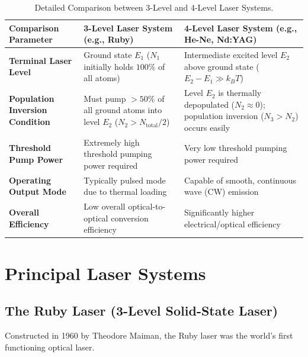 \begin{table}[htbp]
\centering
\small
\renewcommand{\arraystretch}{1.3}
\begin{tabularx}{\linewidth}{lXX}
\toprule
\textbf{Comparison Parameter} & \textbf{3-Level Laser System (e.g., Ruby)} & \textbf{4-Level Laser System (e.g., He-Ne, Nd:YAG)} \\
\midrule
\textbf{Terminal Laser Level} & Ground state $E_1$ ($N_1$ initially holds $100\%$ of all atoms) & Intermediate excited level $E_2$ above ground state ($E_2 - E_1 \gg k_B T$) \\
\textbf{Population Inversion Condition} & Must pump $>50\%$ of all ground atoms into level $E_2$ ($N_2 > N_{\text{total}}/2$) & Level $E_2$ is thermally depopulated ($N_2 \approx 0$); population inversion ($N_3 > N_2$) occurs easily \\
\textbf{Threshold Pump Power} & Extremely high threshold pumping power required & Very low threshold pumping power required \\
\textbf{Operating Output Mode} & Typically pulsed mode due to thermal loading & Capable of smooth, continuous wave (CW) emission \\
\textbf{Overall Efficiency} & Low overall optical-to-optical conversion efficiency & Significantly higher electrical/optical efficiency \\
\bottomrule
\end{tabularx}
\caption{Detailed Comparison between 3-Level and 4-Level Laser Systems.}
\label{tab:3vs4-level-comparison}
\end{table}

\section{Principal Laser Systems}

\subsection{The Ruby Laser (3-Level Solid-State Laser)}
Constructed in 1960 by Theodore Maiman, the Ruby laser was the world's first functioning optical laser.

